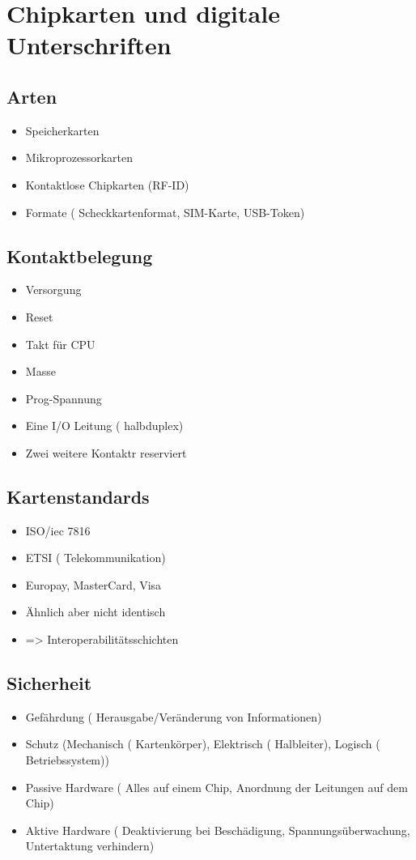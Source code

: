 {\section*{Chipkarten und digitale Unterschriften}

\subsection*{  Arten }
\begin{itemize}
	\item Speicherkarten
	\item Mikroprozessorkarten
	\item Kontaktlose Chipkarten (RF-ID)
	\item Formate ( Scheckkartenformat, SIM-Karte, USB-Token)
\end{itemize}

\subsection*{  Kontaktbelegung }
\begin{itemize}
	\item Versorgung 
	\item Reset
	\item Takt für CPU
	\item Masse
	\item Prog-Spannung
	\item Eine I/O Leitung ( halbduplex)
	\item Zwei weitere Kontaktr reserviert 
\end{itemize}

\subsection*{  Kartenstandards }
\begin{itemize}
	\item ISO/iec 7816
	\item ETSI ( Telekommunikation)
	\item Europay, MasterCard, Visa
	\item Ähnlich aber nicht identisch
	\item => Interoperabilitätsschichten
\end{itemize}


\subsection*{  Sicherheit }
\begin{itemize}
	\item Gefährdung ( Herausgabe/Veränderung von Informationen) 
	\item Schutz (Mechanisch ( Kartenkörper), Elektrisch ( Halbleiter), Logisch ( Betriebssystem))
	\item Passive Hardware ( Alles auf einem Chip, Anordnung der Leitungen auf dem Chip)
	\item Aktive Hardware ( Deaktivierung bei Beschädigung, Spannungsüberwachung, Untertaktung verhindern)
\end{itemize}

}
